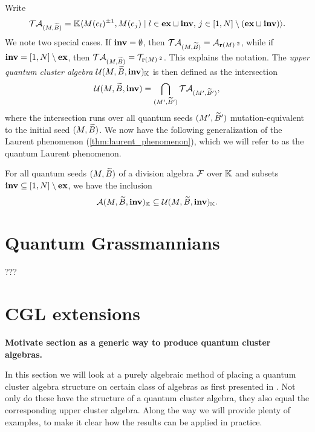 Write
\begin{equation*}
	\mathcal{T}\mathcal{A}_{(M, \widetilde{B})} = \mathbb{K}\langle M(e_l)^{\pm 1}, M(e_j) \mid l \in \mathbf{ex} \sqcup \mathbf{inv},\, j \in [1, N] \setminus (\mathbf{ex} \sqcup \mathbf{inv})\rangle.
\end{equation*}
%
We note two special cases. If $\mathbf{inv} = \emptyset$, then $\mathcal{T}\mathcal{A}_{(M, \widetilde{B})} =
	\mathcal{A}_{\mathbf{r}(M)^{\cdot 2}}$, while if $\mathbf{inv} = [1, N] \setminus \mathbf{ex}$, then $\mathcal{T}\mathcal{A}_{(M,
		\widetilde{B})} = \mathcal{T}_{\mathbf{r}(M)^{\cdot 2}}$. This explains the notation. The \emph{upper quantum
	cluster algebra} $\mathcal{U}(M, \widetilde{B}, \mathbf{inv})_{\mathbb{K}}$ is
then defined as the intersection
\begin{equation*}
	\mathcal{U}(M, \widetilde{B}, \mathbf{inv}) = \bigcap_{(M', \widetilde{B}')} \mathcal{T}\mathcal{A}_{(M', \widetilde{B}')} ,
\end{equation*}
%
where the intersection runs over all quantum seeds $(M', \widetilde{B}')$ mutation-equivalent to
the initial seed $(M, \widetilde{B})$. We now have the following generalization of the Laurent
phenomenon (\cref{thm:laurent_phenomenon}), which we will refer to as the quantum
Laurent phenomenon.
\begin{theorem}\label{thm:quantum_laurent}

	For all quantum seeds $(M, \widetilde{B})$ of a division algebra $\mathcal{F}$ over $\mathbb{K}$ and subsets
	$\mathbf{inv} \subseteq [1, N] \setminus \mathbf{ex}$, we have the inclusion
	\begin{equation*}
		\mathcal{A}(M, \widetilde{B}, \mathbf{inv})_{\mathbb{K}} \subseteq \mathcal{U}(M, \widetilde{B}, \mathbf{inv})_{\mathbb{K}}.
	\end{equation*}
\end{theorem}

\section{Quantum Grassmannians}
???

\section{CGL extensions}

\textbf{Motivate section as a generic way to produce quantum cluster algebras.}

In this section we will look at a purely algebraic method of placing a quantum cluster
algebra structure on certain class of algebras as first presented in
\cite{GoodearlYakimov2017QCA}. Not only do these have the structure of a quantum
cluster algebra, they also equal the corresponding upper cluster algebra. Along the way
we will provide plenty of examples, to make it clear how the results can be applied in
practice.

